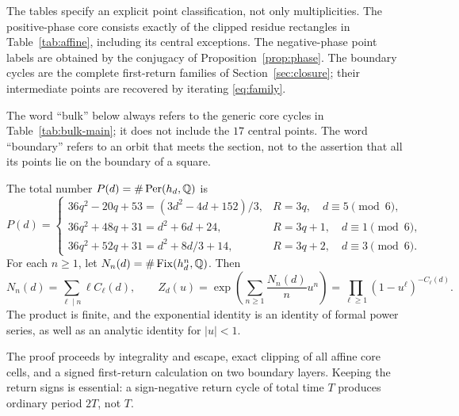 \begin{theorem}
The tables specify an explicit point classification, not only
multiplicities. The positive-phase core consists exactly of the clipped
residue rectangles in Table~\ref{tab:affine}, including its central
exceptions. The negative-phase point labels are obtained by the
conjugacy of Proposition~\ref{prop:phase}. The boundary cycles are the
complete first-return families of Section~\ref{sec:closure}; their
intermediate points are recovered by iterating \eqref{eq:family}.
\end{theorem}

The word ``bulk'' below always refers to the generic core cycles in
Table~\ref{tab:bulk-main}; it does not include the $17$ central points.
The word ``boundary'' refers to an orbit that meets the section, not to
the assertion that all its points lie on the boundary of a square.

\begin{corollary}\label{cor:counts}
The total number $P(d)=\#\operatorname{Per}(h_d,\mathbb Q)$ is
\begin{equation}\label{eq:total}
P(d)=
\begin{cases}
36q^2-20q+53=(3d^2-4d+152)/3,& R=3q,\quad d\equiv5\pmod6,\\
36q^2+48q+31=d^2+6d+24,& R=3q+1,\quad d\equiv1\pmod6,\\
36q^2+52q+31=d^2+8d/3+14,& R=3q+2,\quad d\equiv3\pmod6.
\end{cases}
\end{equation}
For each $n\ge1$, let $N_n(d)=\#\operatorname{Fix}(h_d^n,\mathbb Q)$. Then
\begin{equation}\label{eq:zeta}
 N_n(d)=\sum_{\ell\mid n}\ell C_\ell(d),\qquad
 Z_d(u)=\exp\left(\sum_{n\ge1}\frac{N_n(d)}n u^n\right)
       =\prod_{\ell\ge1}(1-u^\ell)^{-C_\ell(d)}.
\end{equation}
The product is finite, and the exponential identity is an identity of
formal power series, as well as an analytic identity for $|u|<1$.
\end{corollary}

The proof proceeds by integrality and escape, exact clipping of all
affine core cells, and a signed first-return calculation on two boundary
layers. Keeping the return signs is essential: a sign-negative return
cycle of total time $T$ produces ordinary period $2T$, not $T$.
